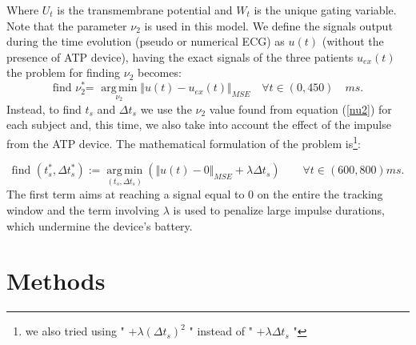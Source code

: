 \documentclass[11pt,a4paper]{article}
\DeclareMathOperator*{\argmin}{arg\,min}
\begin{document}
Where $U_t$ is the transmembrane potential and $W_t$ is the unique gating variable. Note that the parameter $\nu_2$ is used in this model.\newline
We define the signals output during the time evolution (pseudo or numerical ECG) as $u(t)$ (without the presence of ATP device), having the exact signals of the three patients $u_{ex}(t)$ the problem for finding $\nu_2$ becomes:
    \begin{equation}\label{nu2}
    \text{find $\nu_{2}^{*}$= } \argmin\limits_{\nu_2} \Vert u(t)-u_{ex}(t) \Vert_{MSE}  \quad \forall t \in (0,450) \quad  ms.
    \end{equation}
Instead, to find $t_{s}$ and $\Delta t_{s}$ we use the $\nu_2$ value found from equation (\ref{nu2}) for each subject and, this time, we also take into account the effect of the impulse from the ATP device. The mathematical formulation of the problem is\footnote{we also tried using " $+ \lambda (\Delta t_s)^2$ " instead of " $+ \lambda \Delta t_s$ "}:

    \begin{equation} \label{min_proc}
        \textrm{find }(t_{s}^{*}, \Delta t _{s}^{*}):= \argmin\limits_{(t_s, \Delta t_s)} (\Vert u(t)-0 \Vert_{MSE} + \lambda \Delta t_s) \qquad \forall t \in (600,800)ms.
    \end{equation}
The first term aims at reaching a signal equal to 0 on the entire the tracking window and the term involving $\lambda$ is used to penalize large impulse durations, which undermine the device's battery.
\section{Methods}
\label{sec:methods}
\end{document}

